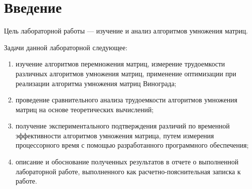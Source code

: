 
\chapter*{Введение}


Цель лабораторной работы --- изучение и анализ алгоритмов умножения матриц.

Задачи данной лабораторной следующее:

\begin{enumerate}[label=\arabic*)]
	\item изучение алгоритмов перемножения матриц, измерение трудоемкости различных алгоритмов умножения матриц,
 применение оптимизации при реализации алгоритма умножения матриц Винограда;
	
	\item проведение сравнительного анализа трудоемкости алгоритмов умножения матриц на основе теоретических вычислений;
	
	\item получение экспериментального подтверждения различий по временной эффективности алгоритмов умножения матрица, путем измерения процессорного время с помощью разработанного программного обеспечения;
	
	\item описание и обоснование полученных результатов в отчете о выполненной лабораторной работе, выполненного как расчетно-пояснительная записка к работе. 
\end{enumerate}